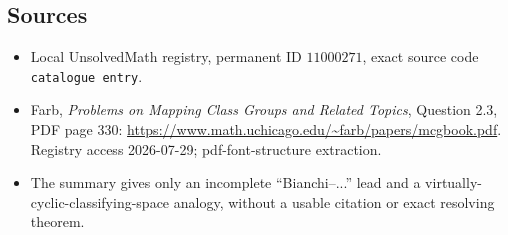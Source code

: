 \documentclass[11pt]{article}
\begin{document}
\subsection{Sources}
\begin{itemize}
\item Local UnsolvedMath registry, permanent ID \(11000271\), exact source code \texttt{catalogue entry}.
\item Farb, \emph{Problems on Mapping Class Groups and Related Topics}, Question 2.3, PDF page 330: \url{https://www.math.uchicago.edu/~farb/papers/mcgbook.pdf}. Registry access 2026-07-29; pdf-font-structure extraction.
\item The summary gives only an incomplete ``Bianchi--...'' lead and a virtually-cyclic-classifying-space analogy, without a usable citation or exact resolving theorem.
\end{itemize}
\end{document}
